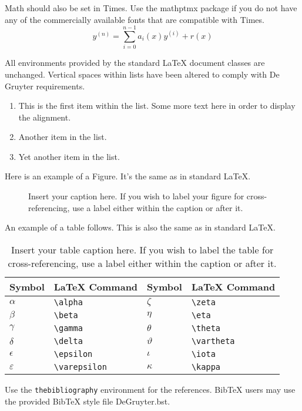 \documentclass[letterpaper,12pt]{article}
\begin{document}
Math should also be set in Times. Use the mathptmx package if you do not have
any of the commercially available fonts that are compatible with Times.
\begin{equation}
    y^{(n)} = \sum_{i=0}^{n-1} a_i(x) y^{(i)} + r(x) 
\end{equation}

All environments provided by the standard LaTeX document classes are
unchanged. Vertical spaces within lists have been altered to comply with De Gruyter
requirements.
\begin{enumerate}
\item This is the first item within the list. Some more text here in order to
  display the alignment.
\item Another item in the list.
\item Yet another item in the list.
\end{enumerate}

Here is an example of a Figure. It's the same as in standard LaTeX.

\begin{figure}[!h]
\centering
\caption{Insert your caption here. If you wish to label your figure for
  cross-referencing, use a label either within the caption or after it.}
\label{fig1}
\end{figure}

An example of a table follows. This is also the same as in standard LaTeX.

\begin{table}[!h]
\centering
\caption{Insert your table caption here. If you wish to label the table for
  cross-referencing, use a label either within the caption or after it.}
\begin{tabular}{llll}
\hline
Symbol        & LaTeX Command      & Symbol      & LaTeX Command \\
\hline
$\alpha$      & \verb+\alpha+      & $\zeta$     & \verb+\zeta+ \\
$\beta$       & \verb+\beta+       & $\eta$      & \verb+\eta+ \\
$\gamma$      & \verb+\gamma+      & $\theta$    & \verb+\theta+ \\
$\delta$      & \verb+\delta+      & $\vartheta$ & \verb+\vartheta+ \\
$\epsilon$    & \verb+\epsilon+    & $\iota$     & \verb+\iota+ \\
$\varepsilon$ & \verb+\varepsilon+ & $\kappa$    & \verb+\kappa+ \\
\hline
\end{tabular}
\end{table}

Use the \verb+thebibliography+ environment for the references.  BibTeX users may
use the provided BibTeX style file DeGruyter.bst.



\end{document}
